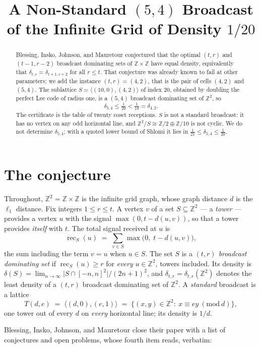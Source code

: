 \documentclass[11pt]{amsart}
\title[A non-standard $(5,4)$ broadcast of density $1/20$]
{A Non-Standard $(5,4)$ Broadcast of the Infinite Grid of Density $1/20$}
\date{}
\theoremstyle{remark}
\newcommand{\ZZ}{\mathbb{Z}}
\newcommand{\dens}{\delta}
\newcommand{\rec}{\operatorname{rec}}
\newcommand{\Tstd}{T}
\begin{document}
\begin{abstract}
Blessing, Insko, Johnson, and Mauretour conjectured that the optimal $(t,r)$ and
$(t-1,r-2)$ broadcast dominating sets of $\ZZ\times\ZZ$ have equal density,
equivalently that $\dens_{t,r}=\dens_{t+1,r+2}$ for all $r\le t$. That
conjecture was already known to fail at other parameters; we add the instance
$(t,r)=(4,2)$, that is the pair of cells $(4,2)$ and $(5,4)$. The sublattice
$S=\langle(10,0),(4,2)\rangle$ of index $20$, obtained by doubling the perfect
Lee code of radius one, is a $(5,4)$ broadcast dominating set of $\ZZ^2$, so
\[
 \dens_{5,4}\le\tfrac1{20}<\tfrac1{18}=\dens_{4,2}.
\]
The certificate is the table of twenty coset receptions. $S$ is not a standard
broadcast: it has no vertex on any odd horizontal line, and
$\ZZ^2/S\cong\ZZ/2\oplus\ZZ/10$ is not cyclic. We do not determine
$\dens_{5,4}$; with a quoted lower bound of Shlomi it lies in
$\tfrac1{21}\le\dens_{5,4}\le\tfrac1{20}$.
\end{abstract}

\maketitle

\section{The conjecture}

Throughout, $\ZZ^2=\ZZ\times\ZZ$ is the infinite grid graph, whose graph
distance $d$ is the $\ell_1$ distance. Fix integers $1\le r\le t$. A vertex
$v$ of a set $S\subseteq\ZZ^2$ --- a \emph{tower} --- provides a vertex $u$ with
the signal $\max(0,t-d(u,v))$, so that a tower provides \emph{itself} with $t$.
The total signal received at $u$ is
\[
 \rec_S(u)\;=\;\sum_{v\in S}\max\bigl(0,\;t-d(u,v)\bigr),
\]
the sum including the term $v=u$ when $u\in S$. The set $S$ is a \emph{$(t,r)$
broadcast dominating set} if $\rec_S(u)\ge r$ for \emph{every} $u\in\ZZ^2$,
towers included. Its density is
$\dens(S)=\lim_{n\to\infty}\lvert S\cap[-n,n]^2\rvert/(2n+1)^2$, and
$\dens_{t,r}=\dens_{t,r}(\ZZ^2)$ denotes the least density of a $(t,r)$
broadcast dominating set of $\ZZ^2$. A \emph{standard} broadcast is a lattice
\[
 \Tstd(d,e)\;=\;\langle(d,0),(e,1)\rangle\;=\;\{(x,y)\in\ZZ^2:\ x\equiv ey\ (\mathrm{mod}\ d)\},
\]
one tower out of every $d$ on \emph{every} horizontal line; its density is $1/d$.

Blessing, Insko, Johnson, and Mauretour \cite{BIJM} close their paper with a
list of conjectures and open problems, whose fourth item reads, verbatim:
\end{document}
